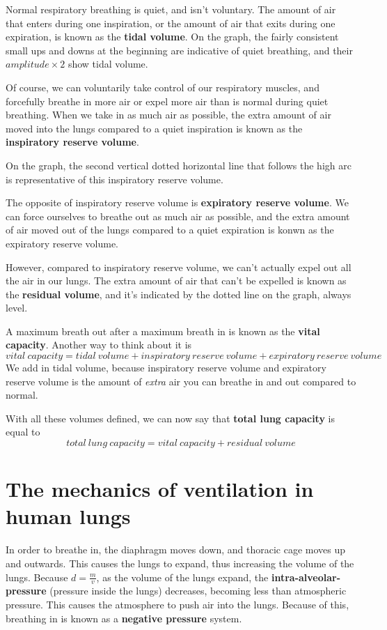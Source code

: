 \documentclass[index]{subfiles}
\begin{document}
Normal respiratory breathing is quiet, and isn't voluntary. The amount of air that enters during one inspiration, or the amount of air that exits during one expiration, is known as the \textbf{tidal volume}. On the graph, the fairly consistent small ups and downs at the beginning are indicative of quiet breathing, and their \(amplitude\times 2\) show tidal volume.

Of course, we can voluntarily take control of our respiratory muscles, and forcefully breathe in more air or expel more air than is normal during quiet breathing. When we take in as much air as possible, the extra amount of air moved into the lungs compared to a quiet inspiration is known as the \textbf{inspiratory reserve volume}.

On the graph, the second vertical dotted horizontal line that follows the high arc is representative of this inspiratory reserve volume.

The opposite of inspiratory reserve volume is \textbf{expiratory reserve volume}. We can force ourselves to breathe out as much air as possible, and the extra amount of air moved out of the lungs compared to a quiet expiration is konwn as the expiratory reserve volume.

However, compared to inspiratory reserve volume, we can't actually expel out all the air in our lungs. The extra amount of air that can't be expelled is known as the \textbf{residual volume}, and it's indicated by the dotted line on the graph, always level.

A maximum breath out after a maximum breath in is known as the \textbf{vital capacity}. Another way to think about it is
\[
    vital\ capacity = tidal\ volume + inspiratory\ reserve\ volume +expiratory\ reserve\ volume
\]
We add in tidal volume, because inspiratory reserve volume and expiratory reserve volume is the amount of \textit{extra} air you can breathe in and out compared to normal.

With all these volumes defined, we can now say that \textbf{total lung capacity}  is equal to
\[
    total\ lung\ capacity = vital\ capacity + residual\ volume
\]

\section{The mechanics of ventilation in human lungs}

In order to breathe in, the diaphragm moves down, and thoracic cage moves up and outwards. This causes the lungs to expand, thus increasing the volume of the lungs. Because \(d=\frac{m}{v}\), as the volume of the lungs expand, the \textbf{intra-alveolar-pressure} (pressure inside the lungs) decreases, becoming less than atmospheric pressure. This causes the atmosphere to push air into the lungs. Because of this, breathing in is known as a \textbf{negative pressure} system.
\end{document}

